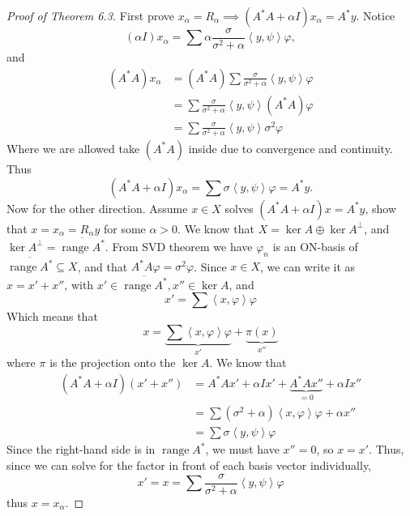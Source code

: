 \documentclass[12pt]{article}
\theoremstyle{definition}
\DeclareMathOperator{\range}{range}
\newcommand\inner[2]{\left\langle#1, #2\right\rangle}
\begin{document}
\begin{proof}[Proof of Theorem 6.3]
    First prove $x_\alpha=R_\alpha\implies (A^*A+\alpha I)x_\alpha = A^*y$. Notice $$(\alpha I)x_\alpha = \sum \alpha \frac{\sigma}{\sigma^2+\alpha}\inner{y}{\psi}\varphi,$$ and 
    \begin{equation*}
        \begin{aligned}
            (A^*A)x_\alpha &= (A^*A)\sum \frac{\sigma}{\sigma^2+\alpha}\inner{y}{\psi}\varphi\\
            &= \sum \frac{\sigma}{\sigma^2+\alpha}\inner{y}{\psi} (A^*A)\varphi\\
            &= \sum \frac{\sigma}{\sigma^2+\alpha}\inner{y}{\psi} \sigma^2\varphi
        \end{aligned}
    \end{equation*}
    Where we are allowed take $(A^*A)$ inside due to convergence and continuity. Thus
    \begin{equation*}
        (A^*A +\alpha I)x_\alpha = \sum {\sigma}\inner{y}{\psi}\varphi = A^*y.
    \end{equation*}
    Now for the other direction. Assume $x\in X$ solves $(A^*A + \alpha I)x = A^*y$, show that $x=x_\alpha = R_\alpha y$ for some $\alpha>0$. We know that $X = \ker A \oplus \ker A^\perp$, and $\ker A^\perp=\overline{\range A^*}$. From SVD theorem we have $\varphi_n$ is an ON-basis of $\overline{\range A^*}\subseteq X$, and that $A^*A\varphi=\sigma^2\varphi$. Since $x\in X$, we can write it as $x=x'+x''$, with $x'\in\overline{\range A^*}, x''\in \ker A$, and 
    \begin{equation*}
        x' = \sum \inner{x}{\varphi} \varphi
    \end{equation*}
    Which means that 
    \begin{equation*}
        x = \underbrace{\sum \inner{x}{\varphi} \varphi}_{x'} + \underbrace{\pi(x)}_{x''}
    \end{equation*}
    where $\pi$ is the projection onto the $\ker A$. We know that 
    \begin{equation*}
        \begin{aligned}
        (A^*A + \alpha I)(x'+x'') &= A^*Ax'+\alpha I x' + \underbrace{A^*Ax''}_{=0} + \alpha I x''\\
        &= \sum (\sigma^2 + \alpha) \inner{x}{\varphi} \varphi + \alpha x''\\
        &= \sum \sigma \inner{y}{\psi}\varphi
        \end{aligned}
    \end{equation*} 
    Since the right-hand side is in $\range A^*$, we must have $x'' = 0$, so $x=x'$.  Thus, since we can solve for the factor in front of each basis vector individually, 
    \begin{equation*}
        x'=x = \sum \frac{\sigma}{\sigma^2+\alpha} \inner{y}{\psi}\varphi
    \end{equation*}
    thus $x=x_\alpha$.
\end{proof}
\end{document}
